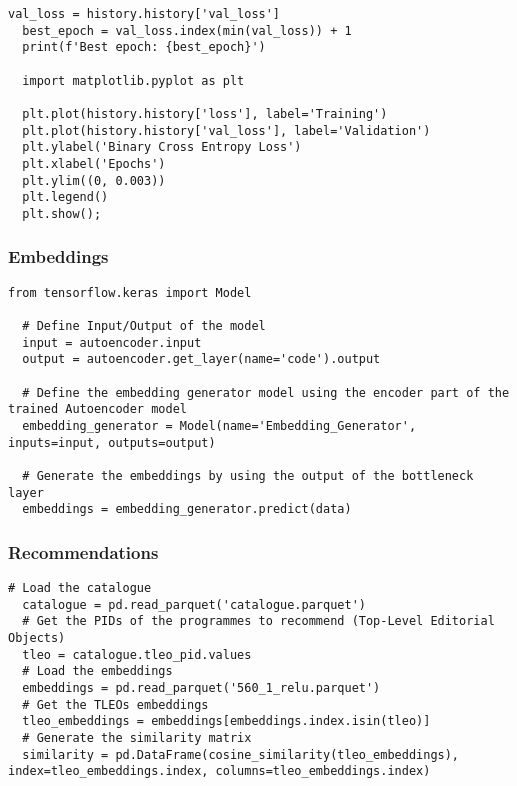 \begin{lstlisting}[caption={Binary cross-entropy loss visualisation}]
  val_loss = history.history['val_loss']
  best_epoch = val_loss.index(min(val_loss)) + 1
  print(f'Best epoch: {best_epoch}')

  import matplotlib.pyplot as plt

  plt.plot(history.history['loss'], label='Training')
  plt.plot(history.history['val_loss'], label='Validation')
  plt.ylabel('Binary Cross Entropy Loss')
  plt.xlabel('Epochs')
  plt.ylim((0, 0.003))
  plt.legend()
  plt.show();
\end{lstlisting}

\subsubsection{Embeddings}

\begin{lstlisting}[caption={Embeddings generation}]
  from tensorflow.keras import Model

  # Define Input/Output of the model
  input = autoencoder.input
  output = autoencoder.get_layer(name='code').output

  # Define the embedding generator model using the encoder part of the trained Autoencoder model
  embedding_generator = Model(name='Embedding_Generator', inputs=input, outputs=output)

  # Generate the embeddings by using the output of the bottleneck layer
  embeddings = embedding_generator.predict(data)
\end{lstlisting}

\subsubsection{Recommendations}

\begin{lstlisting}[caption={Cosine similarity calculation}]
  # Load the catalogue
  catalogue = pd.read_parquet('catalogue.parquet')
  # Get the PIDs of the programmes to recommend (Top-Level Editorial Objects)
  tleo = catalogue.tleo_pid.values
  # Load the embeddings
  embeddings = pd.read_parquet('560_1_relu.parquet')
  # Get the TLEOs embeddings
  tleo_embeddings = embeddings[embeddings.index.isin(tleo)]
  # Generate the similarity matrix
  similarity = pd.DataFrame(cosine_similarity(tleo_embeddings), index=tleo_embeddings.index, columns=tleo_embeddings.index)
\end{lstlisting}

